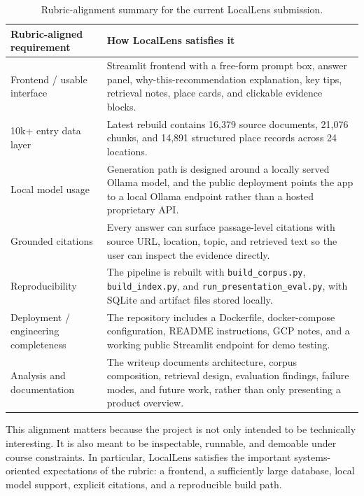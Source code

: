 \documentclass[11pt]{article}
\begin{document}
\begin{table}[H]
\centering
\caption{Rubric-alignment summary for the current LocalLens submission.}
\label{tab:rubric}
\small
\begin{tabularx}{\textwidth}{>{\raggedright\arraybackslash}p{} >{\raggedright\arraybackslash}X}
\toprule
Rubric-aligned requirement & How LocalLens satisfies it \\
\midrule
Frontend / usable interface & Streamlit frontend with a free-form prompt box, answer panel, why-this-recommendation explanation, key tips, retrieval notes, place cards, and clickable evidence blocks. \\
10k+ entry data layer & Latest rebuild contains 16,379 source documents, 21,076 chunks, and 14,891 structured place records across 24 locations. \\
Local model usage & Generation path is designed around a locally served Ollama model, and the public deployment points the app to a local Ollama endpoint rather than a hosted proprietary API. \\
Grounded citations & Every answer can surface passage-level citations with source URL, location, topic, and retrieved text so the user can inspect the evidence directly. \\
Reproducibility & The pipeline is rebuilt with \texttt{build\_corpus.py}, \texttt{build\_index.py}, and \texttt{run\_presentation\_eval.py}, with SQLite and artifact files stored locally. \\
Deployment / engineering completeness & The repository includes a Dockerfile, docker-compose configuration, README instructions, GCP notes, and a working public Streamlit endpoint for demo testing. \\
Analysis and documentation & The writeup documents architecture, corpus composition, retrieval design, evaluation findings, failure modes, and future work, rather than only presenting a product overview. \\
\bottomrule
\end{tabularx}
\end{table}

This alignment matters because the project is not only intended to be technically interesting. It is also meant to be inspectable, runnable, and demoable under course constraints. In particular, LocalLens satisfies the important systems-oriented expectations of the rubric: a frontend, a sufficiently large database, local model support, explicit citations, and a reproducible build path.
\end{document}
